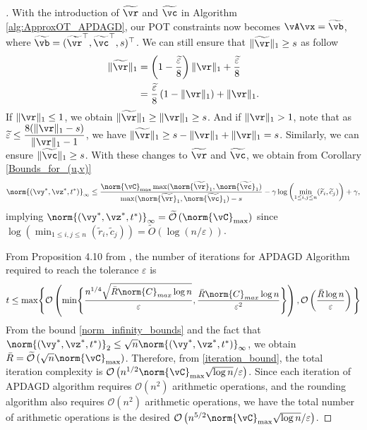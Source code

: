 \begin{proof} [\unskip\nopunct]
    With the introduction of $\widetilde{\vr}$ and $\widetilde{\vc}$ in Algorithm \ref{alg:ApproxOT_APDAGD}, our POT constraints now becomes $
    \vA \vx = \widetilde{\vb}$, where $\widetilde{\vb} = (\widetilde{\vr}^\top, \widetilde{\vc}^\top, s)^\top$. We can still ensure that $\| \widetilde{\vr} \|_1 \geq s$ as follow 
    \begin{align*}
        \| \widetilde{\vr} \|_1 &= \left(1 - \dfrac{\widetilde{\varepsilon}}{8}\right)\|\vr\|_1 + \dfrac{\widetilde{\varepsilon}}{8} \\
        &= \dfrac{\widetilde{\varepsilon}}{8}\left(1 - \|\vr\|_1 \right) + \|\vr\|_1.
    \end{align*}
    If $\|\vr\|_1 \leq 1$, we obtain $\| \widetilde{\vr} \|_1 \geq \|\vr\|_1 \geq s$. And if $\|\vr\|_1 > 1$, note that as $\widetilde{\varepsilon} \leq \dfrac{8 (\|\vr\|_1-s)}{\|\vr\|_1-1}$, we have $\| \widetilde{\vr} \|_1 \geq s - \|\vr\|_1 + \|\vr\|_1 = s$. Similarly, we can ensure $\| \widetilde{\vc} \|_1 \geq s$. With these changes to $\widetilde{\vr}$ and $\widetilde{\vc}$, we obtain from Corollary \ref{Bounds_for_(u,v)}
    \begin{align}
        \norm{(\vy^\ast,\vz^\ast,t^\ast)}_\infty \leq \frac{ \norm{\vC}_{\max} \max(\norm{\widetilde{\vr}}_1, \norm{\widetilde{\vc}}_1)}{ \max(\norm{\widetilde{\vr}}_1, \norm{\widetilde{\vc}}_1)-s} -\gamma \log{ \left( \min_{1 \leq i,j \leq n} (\widetilde{r}_i, \widetilde{c}_j) \right)} + \gamma,
        \label{norm_infinity_bounds}
    \end{align}
    implying $\norm{(\vy^\ast,\vz^\ast,t^\ast)}_\infty = \mathcal{\widetilde{O}}\left( \norm{\vC}_{\max} \right)$ since $ \log{ \left( \min_{1 \leq i,j \leq n} ( \widetilde{r}_i, \widetilde{c}_j) \right)} = \widetilde{O}(\log(n/\varepsilon))$.

    From Proposition 4.10 from \citep{lin2019efficient}, the number of iterations for APDAGD Algorithm required to reach the tolerance $\varepsilon$ is
    \begin{equation} \label{iteration_bound}
        t \leq \max \Biggl\{ \mathcal{O}\left( \min \Biggl\{ \frac{n^{1/4}\sqrt{\Bar{R}\norm{C}_{max} \log{n}}}{\varepsilon}, \frac{\Bar{R}\norm{C}_{max} \log{n}}{\varepsilon^2} \Biggl\} \right), \mathcal{O} \left( \frac{\Bar{R}\log{n}}{\varepsilon} \right) \Biggl\}
    \end{equation}
    From the bound \eqref{norm_infinity_bounds} and the fact that $\norm{(\vy^\ast,\vz^\ast,t^\ast)}_2 \leq \sqrt{n} \norm{(\vy^\ast,\vz^\ast,t^\ast)}_\infty$, we obtain $\Bar{R} = \mathcal{\widetilde{O}}\left(\sqrt{n} \norm{\vC}_{\max} \right)$. Therefore, from \eqref{iteration_bound}, the total iteration complexity is $\mathcal{O}\left(n^{1/2}\norm{\vC}_{\max} \sqrt{\log{n}} / \varepsilon \right)$. Since each iteration of APDAGD algorithm requires $\mathcal{O}(n^2)$ arithmetic operations, and the rounding algorithm also requires $\mathcal{O}(n^2)$ arithmetic operations, we have the total number of arithmetic operations is the desired $\mathcal{O}\left(n^{5/2}\norm{\vC}_{\max} \sqrt{\log{n}} / \varepsilon \right)$. 
\end{proof}


